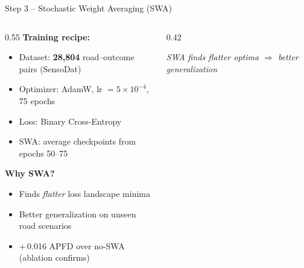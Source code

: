 \documentclass[aspectratio=169,10pt]{beamer}
\begin{document}
\begin{frame}[fragile]{Step 3 -- Stochastic Weight Averaging (SWA)}
  \begin{columns}[T]
    \begin{column}{0.55\linewidth}
      \textbf{Training recipe:}
      \begin{itemize}
        \item Dataset: \textbf{28,804} road--outcome pairs (SensoDat)
        \item Optimizer: AdamW, lr $= 5{\times}10^{-4}$, 75 epochs
        \item Loss: Binary Cross-Entropy
        \item SWA: average checkpoints from epochs 50--75
      \end{itemize}
      \vspace{8pt}
      \textbf{Why SWA?}
      \begin{itemize}
        \item Finds \emph{flatter} loss landscape minima
        \item Better generalization on unseen road scenarios
        \item +\,0.016 APFD over no-SWA (ablation confirms)
      \end{itemize}
    \end{column}
    \begin{column}{0.42\linewidth}
      \begin{center}
      \end{center}
      \vspace{-4pt}
      {\small\itshape SWA finds flatter optima $\Rightarrow$ better generalization}
    \end{column}
  \end{columns}
\end{frame}
\end{document}
